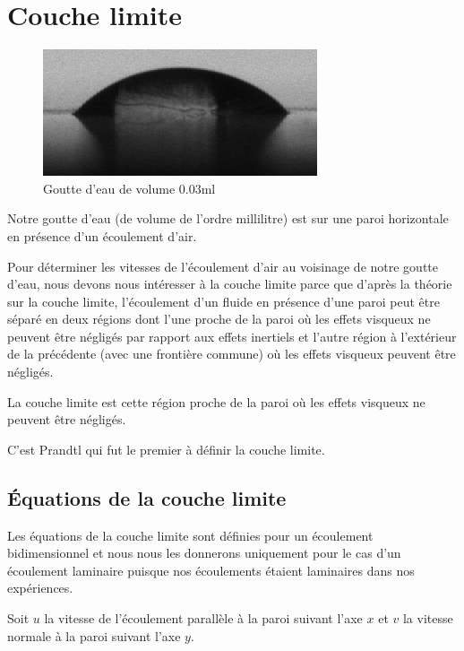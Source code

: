 \chapter{Couche limite}\label{ch:couche}

\begin{figure}[ht]
	\centering
	\includegraphics[scale = 0.6]{./gfx/crop_vitesse=28_volume=003.png}
	\caption{Goutte d'eau de volume $0.03$ml}
\end{figure}
Notre goutte d'eau (de volume de l'ordre millilitre) est sur une paroi horizontale en présence d'un écoulement d'air.


Pour déterminer les vitesses de l'écoulement d'air au voisinage de notre goutte d'eau, nous devons nous intéresser à la couche limite parce que d'après la théorie sur la couche limite, l'écoulement d'un fluide en présence d'une paroi peut être séparé en deux régions dont l'une proche de la paroi où les effets visqueux ne peuvent être négligés par rapport aux effets inertiels et l'autre région à l'extérieur de la précédente (avec une frontière commune) où les effets visqueux peuvent être négligés.

La couche limite est cette région proche de la paroi où les effets visqueux ne peuvent être négligés.

C'est Prandtl qui fut le premier à définir la couche limite. 

\section{Équations de la couche limite }

Les équations de la couche limite sont définies pour un écoulement bidimensionnel et nous nous les donnerons uniquement pour le cas d'un écoulement laminaire puisque nos écoulements étaient laminaires dans nos expériences.

Soit $u$ la vitesse de l'écoulement parallèle à la paroi suivant l'axe $x$ et $v$ la vitesse normale à la paroi suivant l'axe $y$.

